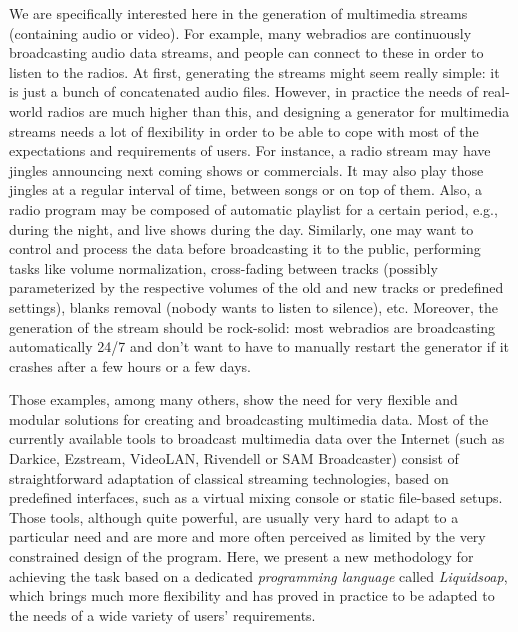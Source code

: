 \documentclass{llncs}
\newcommand{\eg}{{e.g.,}}
\begin{document}
We are specifically interested here in the generation of multimedia streams
(containing audio or video). For example, many webradios are continuously
broadcasting audio data streams, and people can connect to these in order to
listen to the radios. At first, generating the streams might seem really simple:
it is just a bunch of concatenated audio files. However, in practice the needs
of real-world radios are much higher than this, and designing a generator for
multimedia streams needs a lot of flexibility in order to be able to cope with
most of the expectations and requirements of users. For instance, a radio stream
may have jingles announcing next coming shows or commercials. It may also play
those jingles at a regular interval of time, between songs or on top of
them. Also, a radio program may be composed of automatic playlist for a certain
period, \eg{} during the night, and live shows during the day. Similarly, one
may want to control and process the data before broadcasting it to the public,
performing tasks like volume normalization, cross-fading between tracks
(possibly parameterized by the respective volumes of the old and new tracks or
predefined settings), blanks removal (nobody wants to listen to silence),
etc. Moreover, the generation of the stream should be rock-solid: most webradios
are broadcasting automatically 24/7 and don't want to have to manually restart
the generator if it crashes after a few hours or a few days.

Those examples, among many others, show the need for very flexible and modular
solutions for creating and broadcasting multimedia data. Most of the currently
available tools to broadcast multimedia data over the Internet (such as Darkice,
Ezstream, VideoLAN, Rivendell or SAM Broadcaster) consist of straightforward
adaptation of classical streaming technologies, based on
predefined interfaces, such as a virtual mixing console or static file-based
setups. Those tools, although quite powerful, are usually very hard to adapt to
a particular need and are more and more often perceived as limited by the very
constrained design of the program. Here, we present a new methodology for
achieving the task based on a dedicated \emph{programming language} called
\emph{Liquidsoap}, which brings much more flexibility and has proved in practice
to be adapted to the needs of a wide variety of users' requirements.
\end{document}
